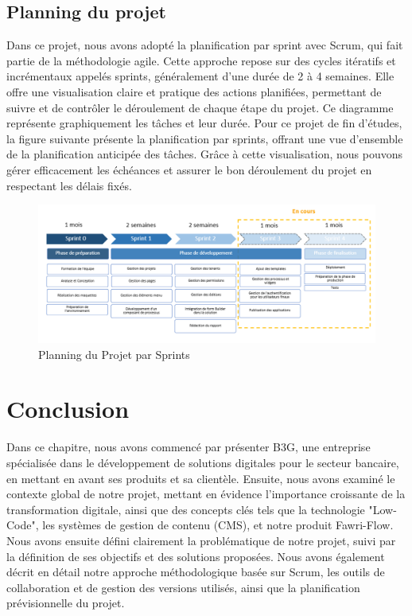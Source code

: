 \subsection{Planning du projet}

\hspace{\parindent}Dans ce projet, nous avons adopté la planification par sprint avec Scrum, qui fait partie de la méthodologie agile. Cette approche repose sur des cycles itératifs et incrémentaux appelés sprints, généralement d'une durée de 2 à 4 semaines. Elle offre une visualisation claire et pratique des actions planifiées, permettant de suivre et de contrôler le déroulement de chaque étape du projet. Ce diagramme représente graphiquement les tâches et leur durée. Pour ce projet de fin d’études, la figure suivante présente la planification par sprints, offrant une vue d'ensemble de la planification anticipée des tâches. Grâce à cette visualisation, nous pouvons gérer efficacement les échéances et assurer le bon déroulement du projet en respectant les délais fixés.

\begin{figure}[H]
    \centering
    \includegraphics[width=18cm]{Figures/sprints.PNG}
    \caption{Planning du Projet par Sprints}
\end{figure}



\newpage

\section*{Conclusion}

\hspace{\parindent}Dans ce chapitre, nous avons commencé par présenter B3G, une entreprise spécialisée dans le développement de solutions digitales pour le secteur bancaire, en mettant en avant ses produits et sa clientèle. Ensuite, nous avons examiné le contexte global de notre projet, mettant en évidence l'importance croissante de la transformation digitale, ainsi que des concepts clés tels que la technologie "Low-Code", les systèmes de gestion de contenu (CMS), et notre produit Fawri-Flow. Nous avons ensuite défini clairement la problématique de notre projet, suivi par la définition de ses objectifs et des solutions proposées. Nous avons également décrit en détail notre approche méthodologique basée sur Scrum, les outils de collaboration et de gestion des versions utilisés, ainsi que la planification prévisionnelle du projet.

